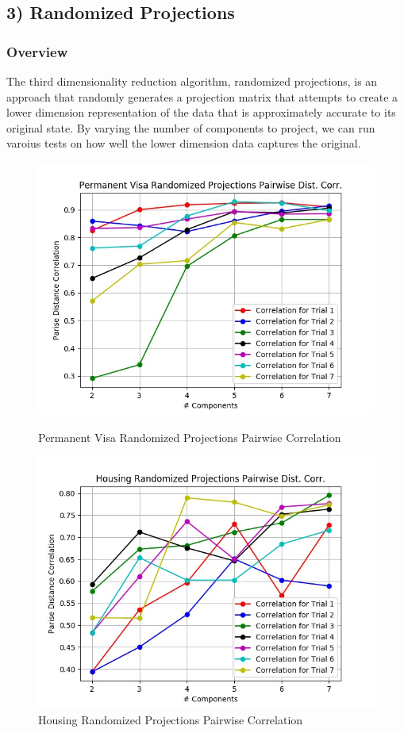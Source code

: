 \documentclass[h]{article}
\begin{document}
\subsection*{3) Randomized Projections}  
\subsubsection*{Overview}
The third dimensionality reduction algorithm, randomized projections, is an 
approach that randomly generates a projection matrix that attempts to create a 
lower dimension representation of the data that is approximately accurate to 
its original state.  By varying the number of components to project, we can run 
varoius tests on how well the lower dimension data captures the original.

 \begin{figure}[H]
      \includegraphics[width=1\textwidth,keepaspectratio]{permanent_visa_randomized_projections_pairwise_distpt_corrpt.jpg} 
      \caption*{Permanent Visa Randomized Projections Pairwise Correlation } 
   \endminipage\hfill
      \includegraphics[width=1\textwidth,keepaspectratio]{housing_randomized_projections_pairwise_distpt_corrpt.jpg} 
      \caption*{Housing Randomized Projections Pairwise Correlation} 
   \endminipage\hfill
\end{figure}
\end{document}
